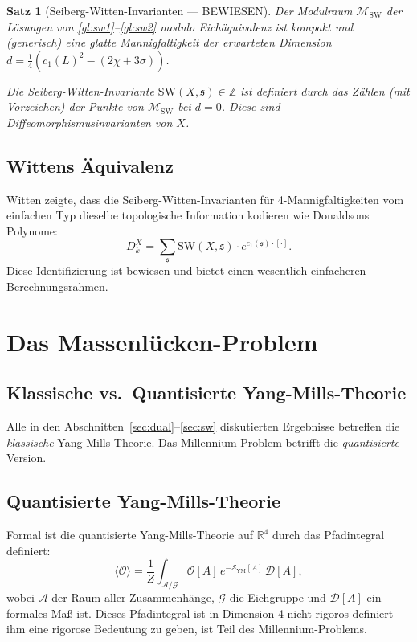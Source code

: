 \documentclass[12pt,a4paper]{amsart}
\newtheorem{theorem}{Satz}[section]
\theoremstyle{definition}
\theoremstyle{remark}
\begin{document}
\begin{theorem}[Seiberg-Witten-Invarianten — BEWIESEN]
\label{satz:sw-invarianten}
Der Modulraum $\mathcal{M}_{\mathrm{SW}}$ der Lösungen von \eqref{gl:sw1}--\eqref{gl:sw2}
modulo Eichäquivalenz ist kompakt und (generisch) eine glatte Mannigfaltigkeit der
erwarteten Dimension $d = \frac{1}{4}(c_1(L)^2 - (2\chi + 3\sigma))$.

Die \emph{Seiberg-Witten-Invariante} $\mathrm{SW}(X, \mathfrak{s}) \in \mathbb{Z}$ ist
definiert durch das Zählen (mit Vorzeichen) der Punkte von $\mathcal{M}_{\mathrm{SW}}$
bei $d = 0$. Diese sind Diffeomorphismusin\-varianten von $X$.
\end{theorem}

\subsection{Wittens Äquivalenz}

Witten \cite{Witten1994} zeigte, dass die Seiberg-Witten-Invarianten für 4-Mannigfaltigkeiten
vom einfachen Typ dieselbe topologische Information kodieren wie Donaldsons Polynome:
\[
  D^X_k = \sum_{\mathfrak{s}} \mathrm{SW}(X, \mathfrak{s}) \cdot e^{c_1(\mathfrak{s}) \cdot [\cdot]}.
\]
Diese Identifizierung ist bewiesen und bietet einen wesentlich einfacheren
Berechnungsrahmen.

\section{Das Massenlücken-Problem}
\label{sec:massluecke}

\subsection{Klassische vs.\ Quantisierte Yang-Mills-Theorie}

Alle in den Abschnitten~\ref{sec:dual}--\ref{sec:sw} diskutierten Ergebnisse betreffen
die \emph{klassische} Yang-Mills-Theorie. Das Millennium-Problem betrifft die
\emph{quantisierte} Version.

\subsection{Quantisierte Yang-Mills-Theorie}

Formal ist die quantisierte Yang-Mills-Theorie auf $\mathbb{R}^4$ durch das Pfadintegral
definiert:
\[
  \langle \mathcal{O} \rangle = \frac{1}{Z} \int_{\mathcal{A}/\mathcal{G}} \mathcal{O}[A] \,
  e^{-\mathcal{S}_{\mathrm{YM}}[A]} \, \mathcal{D}[A],
\]
wobei $\mathcal{A}$ der Raum aller Zusammenhänge, $\mathcal{G}$ die Eichgruppe und
$\mathcal{D}[A]$ ein formales Maß ist. Dieses Pfadintegral ist in Dimension 4 nicht
rigoros definiert — ihm eine rigorose Bedeutung zu geben, ist Teil des Millennium-Problems.
\end{document}
